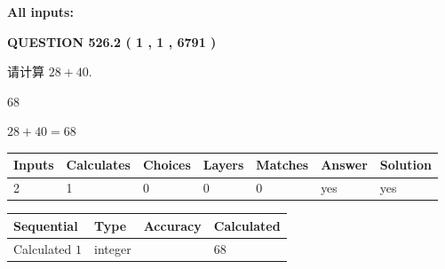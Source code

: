 \documentclass{ctexart}
\begin{document}
   
   
   
\noindent\vspace{0.1in}\hspace{-0.08in} {\textbf{\Large{All inputs: }}}
   
   
  
\vspace{0.2in}
  
{\textbf{\Large{QUESTION
526.2 
 ( 1 , 1 , 6791 )
}}}
  
  
 
请计算 $ %
28 +  %
40 $.
 
 
 
\noindent{}
 
 

68
 
 
\noindent{}
 
 

 
 
 
\noindent{}
 
 

$ %
28 +  %
40=   %
68$
 
 
\noindent{}
 
 

 
   
   
   
   
\noindent\begin{tabular}{|l|l|l|l|l|l|l|}
 \hline
Inputs & Calculates & Choices & Layers & Matches & Answer & Solution \\ \hline
 2  & 
 1  & 
 0
  & 
 0  & 
 0  & 
  yes & 
  yes 
  \\ \hline
 \end{tabular}
   
   
   
   
\noindent{}
   
   
  
  
\noindent\begin{tabular}{|l|l|l|l|}
\hline
 Sequential & Type & Accuracy & Calculated \\ 
\hline
 
 
  Calculated $  1 $ & integer &  & 
  $ 68 $ 
 \\  \hline  
 \end{tabular}
   
\end{document}
